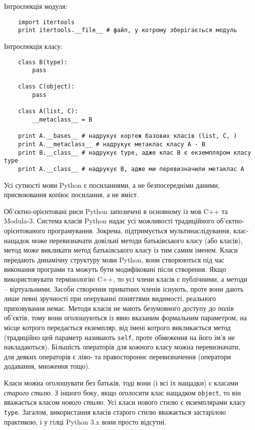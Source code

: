 \documentclass[a4paper, 12pt, onsedie]{article}
\begin{document}
    Інтроспекція модуля:

    \begin{verbatim}
    import itertools
    print itertools.__file__ # файл, у котрому зберігається модуль
    \end{verbatim}

    Інтроспекція класу:

    \begin{verbatim}
    class B(type):
        pass

    class C(object):
        pass

    class A(list, C):
        __metaclass__ = B

    print A.__bases__ # надрукує кортеж базових класів (list, C, )
    print A.__metaclass__ # надрукує метаклас класу A - B
    print B.__class__ # надрукує type, адже клас B є екземпляром класу type
    print A.__class__ # надрукує B, адже ми перевизначили метаклас A
    \end{verbatim}

    Усі сутності мови Python є посиланнями, а не
    безпосередніми даними, присвоювання копіює посилання, а не вміст. 

    Об'єктно-орієнтовані риси Python запозичені в основному із мов C++ та Modula-3. Система 
    класів Python надає усі можливості традиційного об'єктно-орієнтованого програмування.
    Зокрема, підтримується мультинаслідування, клас-нащадок може перевизначати довільні методи 
    батьківського класу (або класів), метод може викликати метод батьківського класу із тим 
    самим іменем. Класи передають динамічну структуру мови Python, вони створюються під час 
    виконання програми та можуть бути модифіковані після створення. Якщо використовувати 
    термінологію C++, то усі члени класів є публічними, а методи -- віртуальними. Засоби 
    створення приватних членів існують, проте вони дають лише певні зручності при оперуванні 
    поняттями видимості, реального приховування немає. Методи класів не мають безумовного 
    доступу до полів об'єктів, тому вони оголошуються із явно вказаним формальним параметром, 
    на місце котрого передається екземпляр, від імені котрого викликається метод (традиційно
    цей параметр називають \texttt{self}, проте обмеження на його ім'я не накладаються).
    Більшість 
    операторів для кожного класу можна перевизначати, для деяких операторів є ліво- та 
    правостороннє перевизначення (оператори додавання, множення тощо).

    Класи можна оголошувати без батьків, тоді вони (і всі їх нащадки) є класами 
    \emph{старого стилю}. З іншого боку, якщо оголосити клас нащадком \texttt{object}, то він 
    вважається класом \emph{нового стилю}. Усі класи нового стилю є екземплярами класу 
    \texttt{type}. Загалом, використання класів старого стилю вважається застарілою практикою,
    і у гілці Python 3.x вони просто відсутні.
\end{document}
